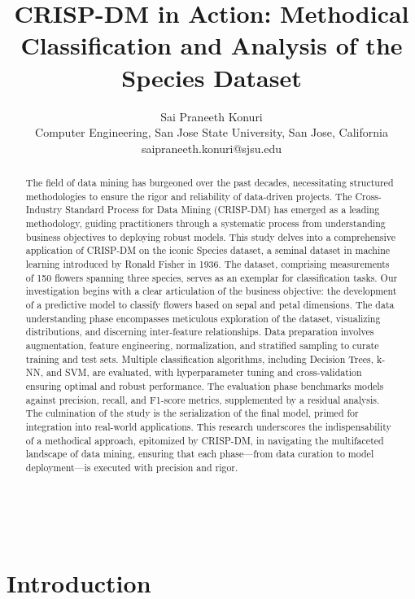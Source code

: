 \documentclass{article}
\title{CRISP-DM in Action: Methodical Classification and Analysis of the Species Dataset}
\author{Sai Praneeth Konuri\\
        \small Computer Engineering, San Jose State University, San Jose, California \\
        \small {saipraneeth.konuri@sjsu.edu}
}
\date{} %
\begin{document}
\maketitle

\begin{abstract} 
\noindent The field of data mining has burgeoned over the past decades, necessitating structured methodologies to ensure the rigor and reliability of data-driven projects. The Cross-Industry Standard Process for Data Mining (CRISP-DM) has emerged as a leading methodology, guiding practitioners through a systematic process from understanding business objectives to deploying robust models. This study delves into a comprehensive application of CRISP-DM on the iconic Species dataset, a seminal dataset in machine learning introduced by Ronald Fisher in 1936. The dataset, comprising measurements of 150 flowers spanning three species, serves as an exemplar for classification tasks. Our investigation begins with a clear articulation of the business objective: the development of a predictive model to classify flowers based on sepal and petal dimensions. The data understanding phase encompasses meticulous exploration of the dataset, visualizing distributions, and discerning inter-feature relationships. Data preparation involves augmentation, feature engineering, normalization, and stratified sampling to curate training and test sets. Multiple classification algorithms, including Decision Trees, k-NN, and SVM, are evaluated, with hyperparameter tuning and cross-validation ensuring optimal and robust performance. The evaluation phase benchmarks models against precision, recall, and F1-score metrics, supplemented by a residual analysis. The culmination of the study is the serialization of the final model, primed for integration into real-world applications. This research underscores the indispensability of a methodical approach, epitomized by CRISP-DM, in navigating the multifaceted landscape of data mining, ensuring that each phase—from data curation to model deployment—is executed with precision and rigor.  \end{abstract}

\noindent{}\\


\section{Introduction}
\end{document}
